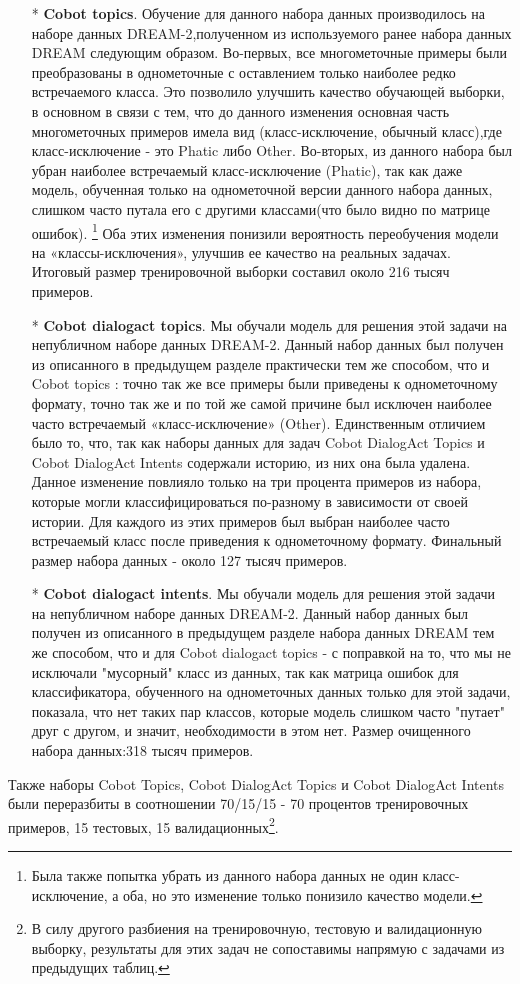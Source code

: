 \begin{itemize}
\item[*]\textbf{Cobot topics}. Обучение для данного набора данных производилось на наборе данных DREAM-2,полученном из используемого ранее набора данных {DREAM} следующим образом.
Во-первых, все многометочные примеры были преобразованы в однометочные с оставлением только наиболее редко встречаемого класса. Это позволило улучшить качество обучающей выборки, в основном в связи с тем, что до данного изменения основная часть многометочных примеров имела вид (класс-исключение, обычный класс),где класс-исключение - это Phatic либо Other. Во-вторых, из данного набора был убран наиболее встречаемый класс-исключение (Phatic), так как даже модель, обученная только на однометочной версии данного набора данных, слишком часто путала его с другими классами(что было видно по матрице ошибок). \footnote{Была также попытка убрать из данного набора данных не один класс-исключение, а оба, но это изменение только понизило качество модели.}
Оба этих изменения понизили вероятность переобучения модели на «классы-исключения», улучшив ее качество на реальных задачах. Итоговый размер тренировочной выборки составил около 216 тысяч примеров.
\item[*]\textbf{Cobot dialogact topics}. Мы обучали модель для решения этой задачи на непубличном наборе данных DREAM-2. Данный набор данных был получен из  описанного в предыдущем разделе практически тем же способом, что и {Cobot topics} : точно так же все примеры были приведены к однометочному формату, точно так же и по той же самой причине был исключен наиболее часто встречаемый «класс-исключение» (Other).
 Единственным отличием было то, что, так как наборы данных для задач {Cobot DialogAct Topics} и {Cobot DialogAct Intents} содержали историю, из них она была удалена. Данное изменение повлияло только на три процента примеров из набора, которые могли классифицироваться по-разному в зависимости от своей истории. Для каждого из этих примеров был выбран наиболее часто встречаемый класс после приведения к однометочному формату. Финальный размер набора данных - около 127 тысяч примеров.

\item[*]\textbf{Cobot dialogact intents}. Мы обучали модель для решения этой задачи на непубличном наборе данных DREAM-2. Данный набор данных был получен из описанного в предыдущем разделе набора данных {DREAM} тем же способом, что и для {Cobot dialogact topics} - с поправкой на то, что мы не исключали "мусорный" класс из данных, так как матрица ошибок для классификатора, обученного на однометочных данных только для этой задачи, показала, что нет таких пар классов, которые модель слишком часто "путает" друг с другом, и значит, необходимости в этом нет. Размер очищенного набора данных:318 тысяч примеров.
\end{itemize}
Также наборы {Cobot Topics}, {Cobot DialogAct Topics} и {Cobot DialogAct Intents} были переразбиты в соотношении 70/15/15 - 70 процентов тренировочных примеров, 15 тестовых, 15 валидационных\footnote{В силу другого разбиения на тренировочную, тестовую и валидационную выборку, результаты для этих задач не сопоставимы напрямую с задачами из предыдущих таблиц.}.

